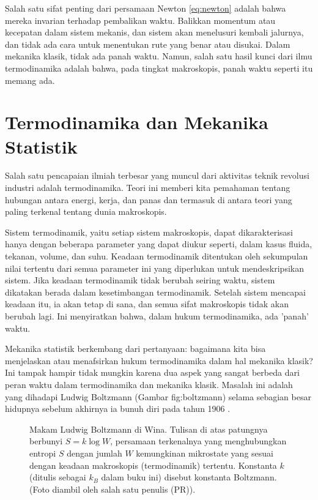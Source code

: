 \documentclass[a4paper,12pt]{book}
\begin{document}
Salah satu sifat penting dari persamaan Newton \eqref{eq:newton} adalah bahwa mereka invarian terhadap pembalikan waktu. Balikkan momentum atau kecepatan dalam sistem mekanis, dan sistem akan menelusuri kembali jalurnya, dan tidak ada cara untuk menentukan rute yang benar atau disukai. Dalam mekanika klasik, tidak ada panah waktu. Namun, salah satu hasil kunci dari ilmu termodinamika adalah bahwa, pada tingkat makroskopis, panah waktu seperti itu memang ada.

\section{Termodinamika dan Mekanika Statistik}
\label{sec:1.4}

Salah satu pencapaian ilmiah terbesar yang muncul dari aktivitas teknik revolusi industri adalah termodinamika. Teori ini memberi kita pemahaman tentang hubungan antara energi, kerja, dan panas dan termasuk di antara teori yang paling terkenal tentang dunia makroskopis.

Sistem termodinamik, yaitu setiap sistem makroskopis, dapat dikarakterisasi hanya dengan beberapa parameter yang dapat diukur seperti, dalam kasus fluida, tekanan, volume, dan suhu. Keadaan termodinamik ditentukan oleh sekumpulan nilai tertentu dari semua parameter ini yang diperlukan untuk mendeskripsikan sistem. Jika keadaan termodinamik tidak berubah seiring waktu, sistem dikatakan berada dalam kesetimbangan termodinamik. Setelah sistem mencapai keadaan itu, ia akan tetap di sana, dan semua sifat makroskopis tidak akan berubah lagi. Ini menyiratkan bahwa, dalam hukum termodinamika, ada 'panah' waktu.

Mekanika statistik berkembang dari pertanyaan: bagaimana kita bisa menjelaskan atau menafsirkan hukum termodinamika dalam hal mekanika klasik? Ini tampak hampir tidak mungkin karena dua aspek yang sangat berbeda dari peran waktu dalam termodinamika dan mekanika klasik. Masalah ini adalah yang dihadapi Ludwig Boltzmann (Gambar  {fig:boltzmann}) selama sebagian besar hidupnya sebelum akhirnya ia bunuh diri pada tahun 1906 \cite{cercignani1998}.

\begin{figure}[h]
\centering
\caption{Makam Ludwig Boltzmann di Wina. Tulisan di atas patungnya berbunyi $S = k \log W$, persamaan terkenalnya yang menghubungkan entropi $S$ dengan jumlah $W$ kemungkinan mikrostate yang sesuai dengan keadaan makroskopis (termodinamik) tertentu. Konstanta $k$ (ditulis sebagai $k_B$ dalam buku ini) disebut konstanta Boltzmann. (Foto diambil oleh salah satu penulis (PR)).}
\label{fig:boltzmann}
\end{figure}
\end{document}
